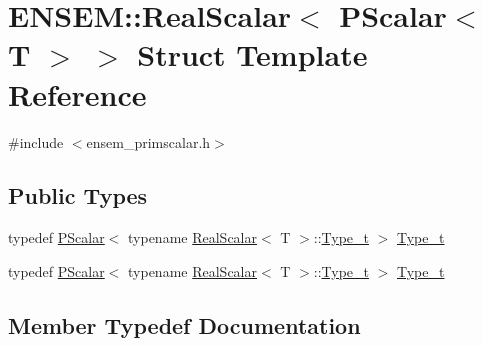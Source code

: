 \hypertarget{structENSEM_1_1RealScalar_3_01PScalar_3_01T_01_4_01_4}{}\section{E\+N\+S\+EM\+:\+:Real\+Scalar$<$ P\+Scalar$<$ T $>$ $>$ Struct Template Reference}
\label{structENSEM_1_1RealScalar_3_01PScalar_3_01T_01_4_01_4}


{\ttfamily \#include $<$ensem\+\_\+primscalar.\+h$>$}

\subsection*{Public Types}
\begin{DoxyCompactItemize}
\item 
typedef \mbox{\hyperlink{classENSEM_1_1PScalar}{P\+Scalar}}$<$ typename \mbox{\hyperlink{structENSEM_1_1RealScalar}{Real\+Scalar}}$<$ T $>$\+::\mbox{\hyperlink{structENSEM_1_1RealScalar_3_01PScalar_3_01T_01_4_01_4_a904a917e492c04b2e0f09ff24b5c6f1c}{Type\+\_\+t}} $>$ \mbox{\hyperlink{structENSEM_1_1RealScalar_3_01PScalar_3_01T_01_4_01_4_a904a917e492c04b2e0f09ff24b5c6f1c}{Type\+\_\+t}}
\item 
typedef \mbox{\hyperlink{classENSEM_1_1PScalar}{P\+Scalar}}$<$ typename \mbox{\hyperlink{structENSEM_1_1RealScalar}{Real\+Scalar}}$<$ T $>$\+::\mbox{\hyperlink{structENSEM_1_1RealScalar_3_01PScalar_3_01T_01_4_01_4_a904a917e492c04b2e0f09ff24b5c6f1c}{Type\+\_\+t}} $>$ \mbox{\hyperlink{structENSEM_1_1RealScalar_3_01PScalar_3_01T_01_4_01_4_a904a917e492c04b2e0f09ff24b5c6f1c}{Type\+\_\+t}}
\end{DoxyCompactItemize}


\subsection{Member Typedef Documentation}
\mbox{\label{structENSEM_1_1RealScalar_3_01PScalar_3_01T_01_4_01_4_a904a917e492c04b2e0f09ff24b5c6f1c}} 
